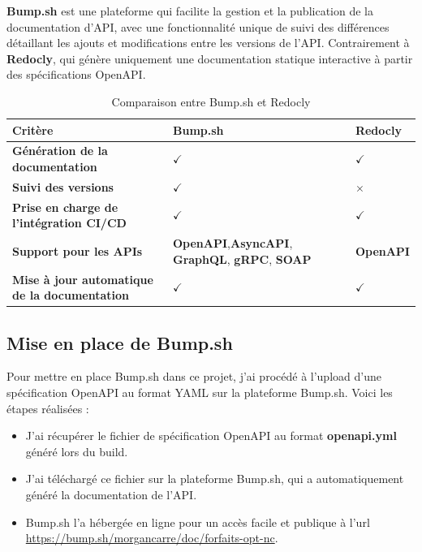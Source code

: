 \documentclass{article}
\begin{document}
	\textbf{Bump.sh} est une plateforme qui facilite la gestion et la publication de la documentation d'API, avec une fonctionnalité unique de suivi des différences détaillant les ajouts et modifications entre les versions de l'API. Contrairement à \textbf{Redocly}, qui génère uniquement une documentation statique interactive à partir des spécifications OpenAPI.	
	
	\begin{table}[h!]
		\centering
		\begin{tabularx}{\textwidth}{|X|X|X|}
			\hline
			\textbf{Critère} & \textbf{Bump.sh} & \textbf{Redocly} \\
			\hline
			\textbf{Génération de la documentation} & $\checkmark$ & $\checkmark$ \\
			\hline
			\textbf{Suivi des versions} & $\checkmark$ & $\times$ \\
			\hline
			\textbf{Prise en charge de l'intégration CI/CD} & $\checkmark$ & $\checkmark$ \\
			\hline
			\textbf{Support pour les APIs} &  \textbf{OpenAPI},\textbf{AsyncAPI}, \textbf{GraphQL}, \textbf{gRPC}, \textbf{SOAP} & \textbf{OpenAPI} \\
			\hline
			\textbf{Mise à jour automatique de la documentation} & $\checkmark$ & $\checkmark$ \\
			\hline
		\end{tabularx}
		\caption{Comparaison entre Bump.sh et Redocly}
	\end{table}
	\subsection{Mise en place de Bump.sh}
	
	Pour mettre en place Bump.sh dans ce projet, j'ai procédé à l'upload d'une spécification OpenAPI au format YAML sur la plateforme Bump.sh. Voici les étapes réalisées :
	
	\begin{itemize}
		\item J'ai récupérer le fichier de spécification OpenAPI au format \textbf{openapi.yml} généré lors du build.
		\item J'ai téléchargé ce fichier sur la plateforme Bump.sh, qui a automatiquement généré la documentation de l'API.
		\item Bump.sh l'a hébergée en ligne pour un accès facile et publique à l'url \url{https://bump.sh/morgancarre/doc/forfaits-opt-nc}.
	\end{itemize}
	
\end{document}
